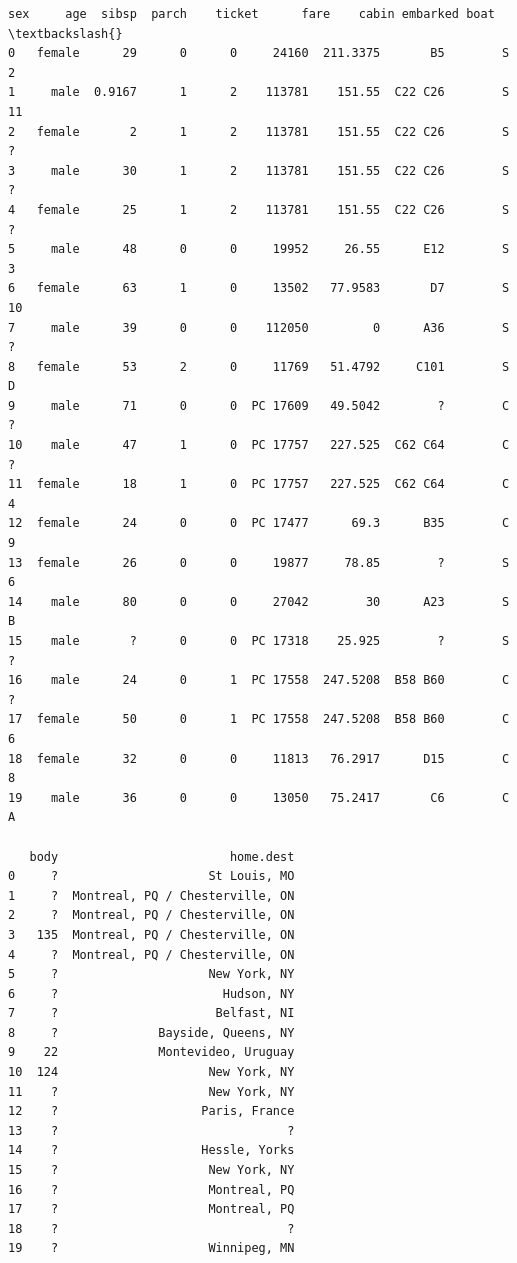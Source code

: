 \documentclass[11pt]{article}
\begin{document}
\begin{tcolorbox}[breakable, size=fbox, boxrule=.5pt, pad at break*=1mm, opacityfill=0]
\begin{Verbatim}[commandchars=\\\{\}]
       sex     age  sibsp  parch    ticket      fare    cabin embarked boat  \textbackslash{}
0   female      29      0      0     24160  211.3375       B5        S    2
1     male  0.9167      1      2    113781    151.55  C22 C26        S   11
2   female       2      1      2    113781    151.55  C22 C26        S    ?
3     male      30      1      2    113781    151.55  C22 C26        S    ?
4   female      25      1      2    113781    151.55  C22 C26        S    ?
5     male      48      0      0     19952     26.55      E12        S    3
6   female      63      1      0     13502   77.9583       D7        S   10
7     male      39      0      0    112050         0      A36        S    ?
8   female      53      2      0     11769   51.4792     C101        S    D
9     male      71      0      0  PC 17609   49.5042        ?        C    ?
10    male      47      1      0  PC 17757   227.525  C62 C64        C    ?
11  female      18      1      0  PC 17757   227.525  C62 C64        C    4
12  female      24      0      0  PC 17477      69.3      B35        C    9
13  female      26      0      0     19877     78.85        ?        S    6
14    male      80      0      0     27042        30      A23        S    B
15    male       ?      0      0  PC 17318    25.925        ?        S    ?
16    male      24      0      1  PC 17558  247.5208  B58 B60        C    ?
17  female      50      0      1  PC 17558  247.5208  B58 B60        C    6
18  female      32      0      0     11813   76.2917      D15        C    8
19    male      36      0      0     13050   75.2417       C6        C    A

   body                        home.dest
0     ?                     St Louis, MO
1     ?  Montreal, PQ / Chesterville, ON
2     ?  Montreal, PQ / Chesterville, ON
3   135  Montreal, PQ / Chesterville, ON
4     ?  Montreal, PQ / Chesterville, ON
5     ?                     New York, NY
6     ?                       Hudson, NY
7     ?                      Belfast, NI
8     ?              Bayside, Queens, NY
9    22              Montevideo, Uruguay
10  124                     New York, NY
11    ?                     New York, NY
12    ?                    Paris, France
13    ?                                ?
14    ?                    Hessle, Yorks
15    ?                     New York, NY
16    ?                     Montreal, PQ
17    ?                     Montreal, PQ
18    ?                                ?
19    ?                     Winnipeg, MN
\end{Verbatim}
\end{tcolorbox}
        
\end{document}

